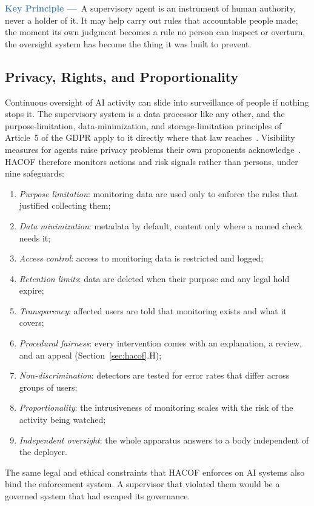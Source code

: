 \documentclass{ieeeaccess}
\newcommand{\hacof}{HACOF}
\begin{document}
\begin{mdframed}[linecolor=steelblue, linewidth=1.2pt, backgroundcolor=steelblue!6,
  innerleftmargin=8pt, innerrightmargin=8pt, innertopmargin=6pt, innerbottommargin=6pt,
  roundcorner=4pt]
\noindent\textcolor{steelblue}{\bfseries Key Principle ---}~A supervisory agent is an instrument of human authority, never a holder of it. It may help carry out rules that accountable people made; the moment its own judgment becomes a rule no person can inspect or overturn, the oversight system has become the thing it was built to prevent.
\end{mdframed}

\subsection{Privacy, Rights, and Proportionality}
\label{sec:hacof-privacy}

Continuous oversight of AI activity can slide into surveillance of people if nothing stops it. The supervisory system is a data processor like any other, and the purpose-limitation, data-minimization, and storage-limitation principles of Article~5 of the GDPR apply to it directly where that law reaches~\cite{gdpr2016}.
Visibility measures for agents raise privacy problems their own proponents acknowledge~\cite{chan2024visibility}.
\hacof{} therefore monitors actions and risk signals rather than persons, under nine safeguards:
\begin{enumerate}
  \item \textit{Purpose limitation}: monitoring data are used only to enforce the rules that justified collecting them;
  \item \textit{Data minimization}: metadata by default, content only where a named check needs it;
  \item \textit{Access control}: access to monitoring data is restricted and logged;
  \item \textit{Retention limits}: data are deleted when their purpose and any legal hold expire;
  \item \textit{Transparency}: affected users are told that monitoring exists and what it covers;
  \item \textit{Procedural fairness}: every intervention comes with an explanation, a review, and an appeal (Section~\ref{sec:hacof}.H);
  \item \textit{Non-discrimination}: detectors are tested for error rates that differ across groups of users;
  \item \textit{Proportionality}: the intrusiveness of monitoring scales with the risk of the activity being watched;
  \item \textit{Independent oversight}: the whole apparatus answers to a body independent of the deployer.
\end{enumerate}
The same legal and ethical constraints that \hacof{} enforces on AI systems also bind the enforcement system. A supervisor that violated them would be a governed system that had escaped its governance.
\end{document}
